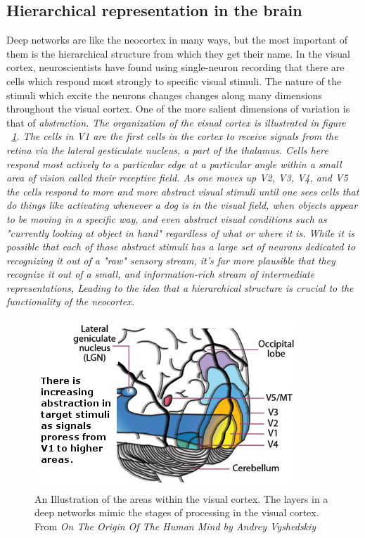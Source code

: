 \documentclass[12pt]{article}
\begin{document}
\begin{doublespacing}
	\subsection{Hierarchical representation in the brain}
		Deep networks are like the neocortex in many ways, but the most important of them is the hierarchical structure from which they get their name. In the visual cortex, neuroscientists have found using single-neuron recording that there are cells which respond most strongly to specific visual stimuli. The nature of the stimuli which excite the neurons changes changes along many dimensions throughout the visual cortex. One of the more salient dimensions of variation is that of \em abstraction\em\cite{hinton2005kind}. The organization of the visual cortex is illustrated in figure ~\ref{fig:visualcortex}. The cells in V1 are the first cells in the cortex to receive signals from the retina via the lateral gesticulate nucleus, a part of the thalamus. Cells here respond most actively to a particular edge at a particular angle within a small area of vision called their receptive field. As one moves up V2, V3, V4, and V5 the cells respond to more and more abstract visual stimuli until one sees cells that do things like activating whenever a dog is in the visual field, when objects appear to be moving in a specific way, and even abstract visual conditions such as "currently looking at object in hand" regardless of what or where it is. While it is possible that each of those abstract stimuli has a large set of neurons dedicated to recognizing it out of a "raw" sensory stream, it's far more plausible that they recognize it out of a small, and information-rich stream of intermediate representations, Leading to the idea that a hierarchical structure is crucial to the functionality of the neocortex.
		
\begin{figure}[p]
\centering
\includegraphics[scale=0.8]{visual_cortex}
\caption{An Illustration of the areas within the visual cortex. The layers in a deep networks mimic the stages of processing in the visual cortex. From \em On The Origin Of The Human Mind \em by Andrey Vyshedskiy}
\label{fig:visualcortex}
\end{figure}
		

\end{doublespacing}
\end{document}
